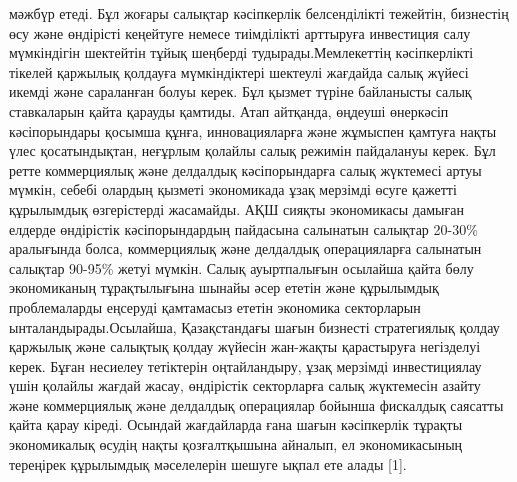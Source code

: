 мәжбүр етеді. Бұл жоғары салықтар кәсіпкерлік белсенділікті тежейтін,
бизнестің өсу және өндірісті кеңейтуге немесе тиімділікті арттыруға
инвестиция салу мүмкіндігін шектейтін тұйық шеңберді
тудырады.Мемлекеттің кәсіпкерлікті тікелей қаржылық қолдауға
мүмкіндіктері шектеулі жағдайда салық жүйесі икемді және сараланған
болуы керек. Бұл қызмет түріне байланысты салық ставкаларын қайта
қарауды қамтиды. Атап айтқанда, өңдеуші өнеркәсіп кәсіпорындары қосымша
құнға, инновацияларға және жұмыспен қамтуға нақты үлес қосатындықтан,
неғұрлым қолайлы салық режимін пайдалануы керек. Бұл ретте коммерциялық
және делдалдық кәсіпорындарға салық жүктемесі артуы мүмкін, себебі
олардың қызметі экономикада ұзақ мерзімді өсуге қажетті құрылымдық
өзгерістерді жасамайды. АҚШ сияқты экономикасы дамыған елдерде
өндірістік кәсіпорындардың пайдасына салынатын салықтар 20-30\%
аралығында болса, коммерциялық және делдалдық операцияларға салынатын
салықтар 90-95\% жетуі мүмкін. Салық ауыртпалығын осылайша қайта бөлу
экономиканың тұрақтылығына шынайы әсер ететін және құрылымдық
проблемаларды еңсеруді қамтамасыз ететін экономика секторларын
ынталандырады.Осылайша, Қазақстандағы шағын бизнесті стратегиялық қолдау
қаржылық және салықтық қолдау жүйесін жан-жақты қарастыруға негізделуі
керек. Бұған несиелеу тетіктерін оңтайландыру, ұзақ мерзімді
инвестициялау үшін қолайлы жағдай жасау, өндірістік секторларға салық
жүктемесін азайту және коммерциялық және делдалдық операциялар бойынша
фискалдық саясатты қайта қарау кіреді. Осындай жағдайларда ғана шағын
кәсіпкерлік тұрақты экономикалық өсудің нақты қозғалтқышына айналып, ел
экономикасының тереңірек құрылымдық мәселелерін шешуге ықпал ете алады
{[}1{]}.

